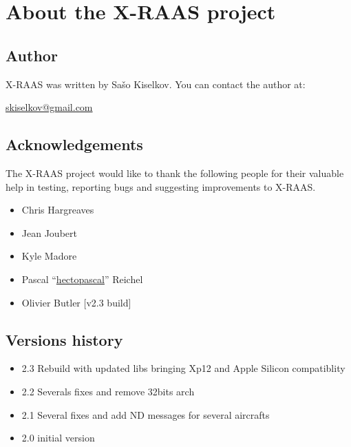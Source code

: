 \documentclass[a4paper,12pt]{article}
\begin{document}
\newpage
\section{About the X-RAAS project}
\label{sec:About}

\subsection{Author}

X-RAAS was written by Sašo Kiselkov. You can contact the author at:

\vspace{1em}

\href{mailto:skiselkov@gmail.com}{skiselkov@gmail.com}

\subsection{Acknowledgements}

The X-RAAS project would like to thank the following people for their
valuable help in testing, reporting bugs and suggesting improvements to
X-RAAS.

\begin{itemize}

\item Chris Hargreaves

\item Jean Joubert

\item Kyle Madore

\item Pascal
``\href{https://www.youtube.com/channel/UCg7RwFfTBq19oIxUkjuo_Ig}{hectopascal}''
Reichel

\item Olivier Butler [v2.3 build]

\end{itemize}

\subsection{Versions history}


\begin{itemize}

\item 2.3 Rebuild with updated libs bringing Xp12 and Apple Silicon compatiblity

\item 2.2 Severals fixes and remove 32bits arch

\item 2.1 Several fixes and add ND messages for several aircrafts

\item 2.0 initial version

\end{itemize}
\end{document}
